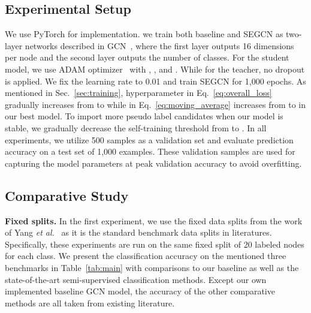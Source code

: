 \documentclass[letterpaper]{article} \usepackage{aaai19}  \usepackage{times}  \usepackage{helvet}  \usepackage{courier}  \usepackage{url}  \usepackage{graphicx}  \usepackage{algorithm}
\begin{document}
\subsection{Experimental Setup}
We use PyTorch for implementation. we train both baseline and SEGCN as two-layer networks described in GCN~\cite{kipf2016semi}, where the first layer outputs 16 dimensions per node and the second layer outputs the number of classes. For the student model, we use ADAM optimizer~\cite{kingma2014adam} with , ,  and . While for the teacher, no dropout is applied. We fix the learning rate to 0.01 and train SEGCN for 1,000 epochs. As mentioned in Sec.~\ref{sec:training}, hyperparameter  in Eq.~\ref{eq:overall_loss} gradually increases from  to  while  in Eq.~\ref{eq:moving_average} increases from  to  in our best model. To import more pseudo label candidates when our model is stable, we gradually decrease the self-training threshold  from  to . In all experiments, we utilize 500 samples as a validation set and evaluate prediction accuracy on a test set of 1,000 examples. These validation samples are used for capturing the model parameters at peak validation accuracy to avoid overfitting.

\subsection{Comparative Study}
\textbf{Fixed splits.} In the first experiment, we use the fixed data splits from the work of Yang \emph{et al.}~\cite{yang2016revisiting} as it is the standard benchmark data splits in literatures. Specifically, these experiments are run on the same fixed split of 20 labeled nodes for each class.  We present the classification accuracy on the mentioned three benchmarks in Table~\ref{tab:main} with comparisons to our baseline as well as the state-of-the-art semi-supervised classification methods. Except our own implemented baseline GCN model, the accuracy of the other comparative methods are all taken from existing literature.
\end{document}
